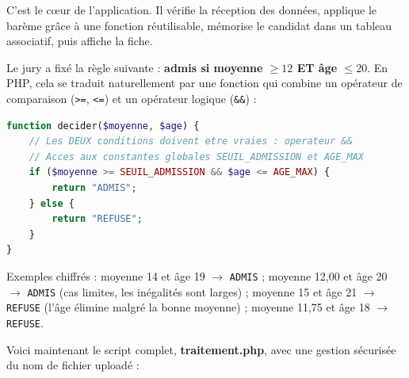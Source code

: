 \documentclass[11pt]{article}
\begin{document}
C'est le cœur de l'application. Il vérifie la réception des données, applique le barème grâce à une fonction réutilisable, mémorise le candidat dans un tableau associatif, puis affiche la fiche.

\begin{exemplebox}[Barème du concours : combiner \texttt{\&\&} et \texttt{>=}]
Le jury a fixé la règle suivante : \textbf{admis si moyenne $\geq 12$ ET âge $\leq 20$}. En PHP, cela se traduit naturellement par une fonction qui combine un opérateur de comparaison (\texttt{>=}, \texttt{<=}) et un opérateur logique (\texttt{\&\&}) :

\begin{lstlisting}[language=Php]
function decider($moyenne, $age) {
    // Les DEUX conditions doivent etre vraies : operateur &&
    // Acces aux constantes globales SEUIL_ADMISSION et AGE_MAX
    if ($moyenne >= SEUIL_ADMISSION && $age <= AGE_MAX) {
        return "ADMIS";
    } else {
        return "REFUSE";
    }
}
\end{lstlisting}

Exemples chiffrés : moyenne 14 et âge 19 $\rightarrow$ \texttt{ADMIS} ; moyenne 12,00 et âge 20 $\rightarrow$ \texttt{ADMIS} (cas limites, les inégalités sont larges) ; moyenne 15 et âge 21 $\rightarrow$ \texttt{REFUSE} (l'âge élimine malgré la bonne moyenne) ; moyenne 11,75 et âge 18 $\rightarrow$ \texttt{REFUSE}.
\end{exemplebox}

Voici maintenant le script complet, \textbf{traitement.php}, avec une gestion sécurisée du nom de fichier uploadé :
\end{document}
